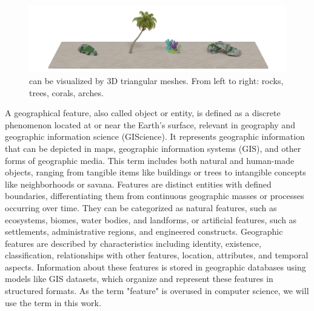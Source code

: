 \begin{figure}
    \includegraphics{assets-demo.pdf}
    \caption{ can be visualized by 3D triangular meshes. From left to right: rocks, trees, corals, arches.}
    \label{fig:env-obj_assets}
\end{figure}
A geographical feature, also called object or entity, is defined as a discrete phenomenon located at or near the Earth's surface, relevant in geography and geographic information science (GIScience). It represents geographic information that can be depicted in maps, geographic information systems (GIS), and other forms of geographic media. This term includes both natural and human-made objects, ranging from tangible items like buildings or trees to intangible concepts like neighborhoods or savana. Features are distinct entities with defined boundaries, differentiating them from continuous geographic masses or processes occurring over time. They can be categorized as natural features, such as ecosystems, biomes, water bodies, and landforms, or artificial features, such as settlements, administrative regions, and engineered constructs. Geographic features are described by characteristics including identity, existence, classification, relationships with other features, location, attributes, and temporal aspects. Information about these features is stored in geographic databases using models like GIS datasets, which organize and represent these features in structured formats. As the term "feature" is overused in computer science, we will use the term  in this work.


